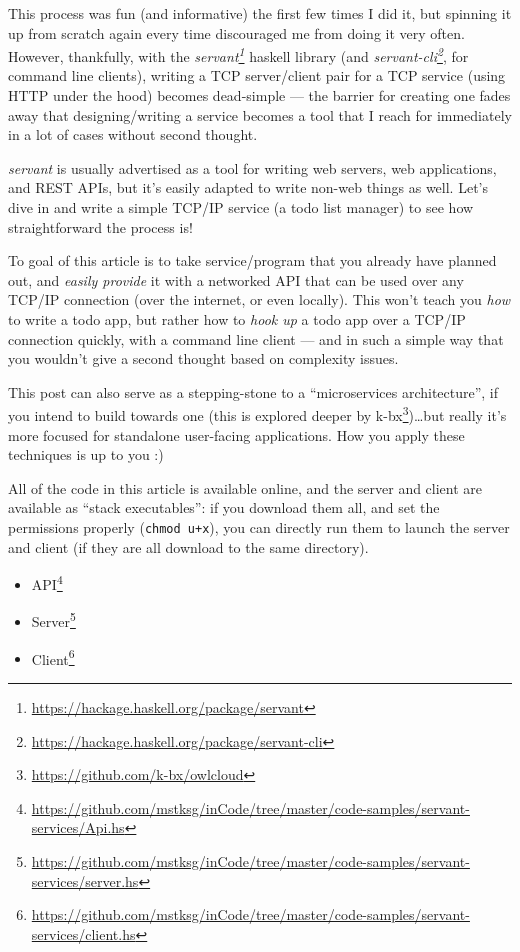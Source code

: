 \documentclass[]{article}
\renewcommand{\href}[2]{#2\footnote{\url{#1}}}
\begin{document}
This process was fun (and informative) the first few times I did it, but
spinning it up from scratch again every time discouraged me from doing it very
often. However, thankfully, with the
\emph{\href{https://hackage.haskell.org/package/servant}{servant}} haskell
library (and
\emph{\href{https://hackage.haskell.org/package/servant-cli}{servant-cli}}, for
command line clients), writing a TCP server/client pair for a TCP service (using
HTTP under the hood) becomes dead-simple --- the barrier for creating one fades
away that designing/writing a service becomes a tool that I reach for
immediately in a lot of cases without second thought.

\emph{servant} is usually advertised as a tool for writing web servers, web
applications, and REST APIs, but it's easily adapted to write non-web things as
well. Let's dive in and write a simple TCP/IP service (a todo list manager) to
see how straightforward the process is!

To goal of this article is to take service/program that you already have planned
out, and \emph{easily provide} it with a networked API that can be used over any
TCP/IP connection (over the internet, or even locally). This won't teach you
\emph{how} to write a todo app, but rather how to \emph{hook up} a todo app over
a TCP/IP connection quickly, with a command line client --- and in such a simple
way that you wouldn't give a second thought based on complexity issues.

This post can also serve as a stepping-stone to a ``microservices
architecture'', if you intend to build towards one (this is explored deeper by
\href{https://github.com/k-bx/owlcloud}{k-bx})\ldots but really it's more
focused for standalone user-facing applications. How you apply these techniques
is up to you :)

All of the code in this article is available online, and the server and client
are available as ``stack executables'': if you download them all, and set the
permissions properly (\texttt{chmod\ u+x}), you can directly run them to launch
the server and client (if they are all download to the same directory).

\begin{itemize}
\tightlist
\item
  \href{https://github.com/mstksg/inCode/tree/master/code-samples/servant-services/Api.hs}{API}
\item
  \href{https://github.com/mstksg/inCode/tree/master/code-samples/servant-services/server.hs}{Server}
\item
  \href{https://github.com/mstksg/inCode/tree/master/code-samples/servant-services/client.hs}{Client}
\end{itemize}
\end{document}
